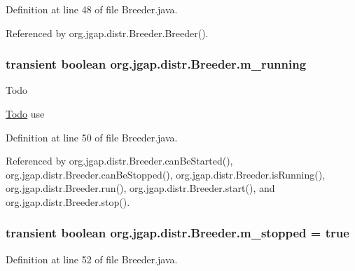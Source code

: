 Definition at line 48 of file Breeder.\-java.



Referenced by org.\-jgap.\-distr.\-Breeder.\-Breeder().

\hypertarget{classorg_1_1jgap_1_1distr_1_1_breeder_a91831c9376bf49003f0f162f1a75f8f2}{
\subsubsection[{m\-\_\-running}]{\setlength{\rightskip}{0pt plus 5cm}transient boolean org.\-jgap.\-distr.\-Breeder.\-m\-\_\-running\hspace{0.3cm}{\ttfamily [private]}}}\label{classorg_1_1jgap_1_1distr_1_1_breeder_a91831c9376bf49003f0f162f1a75f8f2}
\begin{DoxyRefDesc}{Todo}
\item[\hyperlink{todo__todo000059}{Todo}]use \end{DoxyRefDesc}


Definition at line 50 of file Breeder.\-java.



Referenced by org.\-jgap.\-distr.\-Breeder.\-can\-Be\-Started(), org.\-jgap.\-distr.\-Breeder.\-can\-Be\-Stopped(), org.\-jgap.\-distr.\-Breeder.\-is\-Running(), org.\-jgap.\-distr.\-Breeder.\-run(), org.\-jgap.\-distr.\-Breeder.\-start(), and org.\-jgap.\-distr.\-Breeder.\-stop().

\hypertarget{classorg_1_1jgap_1_1distr_1_1_breeder_a4ff067764f6ccbe3eb6c3db7ea542e63}{
\subsubsection[{m\-\_\-stopped}]{\setlength{\rightskip}{0pt plus 5cm}transient boolean org.\-jgap.\-distr.\-Breeder.\-m\-\_\-stopped = true\hspace{0.3cm}{\ttfamily [private]}}}\label{classorg_1_1jgap_1_1distr_1_1_breeder_a4ff067764f6ccbe3eb6c3db7ea542e63}


Definition at line 52 of file Breeder.\-java.



